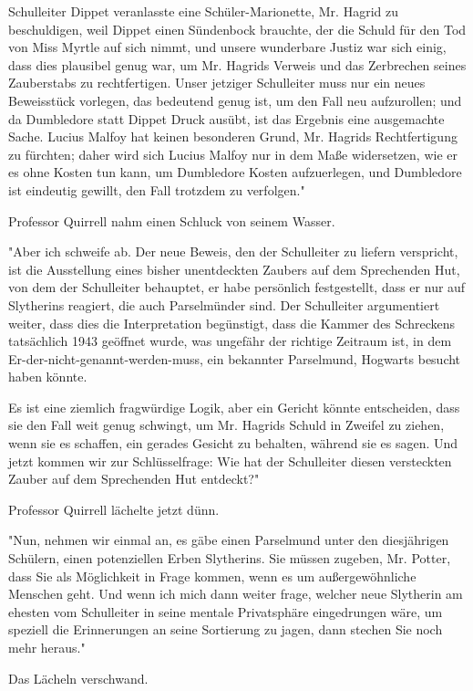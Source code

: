 {Schulleiter Dippet veranlasste eine Schüler-Marionette, Mr. Hagrid zu beschuldigen, weil Dippet einen Sündenbock brauchte, der die Schuld für den Tod von Miss Myrtle auf sich nimmt, und unsere wunderbare Justiz war sich einig, dass dies plausibel genug war, um Mr. Hagrids Verweis und das Zerbrechen seines Zauberstabs zu rechtfertigen. Unser jetziger Schulleiter muss nur ein neues Beweisstück vorlegen, das bedeutend genug ist, um den Fall neu aufzurollen; und da Dumbledore statt Dippet Druck ausübt, ist das Ergebnis eine ausgemachte Sache. Lucius Malfoy hat keinen besonderen Grund, Mr. Hagrids Rechtfertigung zu fürchten; daher wird sich Lucius Malfoy nur in dem Maße widersetzen, wie er es ohne Kosten tun kann, um Dumbledore Kosten aufzuerlegen, und Dumbledore ist eindeutig gewillt, den Fall trotzdem zu verfolgen."

Professor Quirrell nahm einen Schluck von seinem Wasser.

"Aber ich schweife ab. Der neue Beweis, den der Schulleiter zu liefern verspricht, ist die Ausstellung eines bisher unentdeckten Zaubers auf dem Sprechenden Hut, von dem der Schulleiter behauptet, er habe persönlich festgestellt, dass er nur auf Slytherins reagiert, die auch Parselmünder sind. Der Schulleiter argumentiert weiter, dass dies die Interpretation begünstigt, dass die Kammer des Schreckens tatsächlich 1943 geöffnet wurde, was ungefähr der richtige Zeitraum ist, in dem Er-der-nicht-genannt-werden-muss, ein bekannter Parselmund, Hogwarts besucht haben könnte.

Es ist eine ziemlich fragwürdige Logik, aber ein Gericht könnte entscheiden, dass sie den Fall weit genug schwingt, um Mr. Hagrids Schuld in Zweifel zu ziehen, wenn sie es schaffen, ein gerades Gesicht zu behalten, während sie es sagen. Und jetzt kommen wir zur Schlüsselfrage: Wie hat der Schulleiter diesen versteckten Zauber auf dem Sprechenden Hut entdeckt?"

Professor Quirrell lächelte jetzt dünn.

"Nun, nehmen wir einmal an, es gäbe einen Parselmund unter den diesjährigen Schülern, einen potenziellen Erben Slytherins. Sie müssen zugeben, Mr. Potter, dass Sie als Möglichkeit in Frage kommen, wenn es um außergewöhnliche Menschen geht. Und wenn ich mich dann weiter frage, welcher neue Slytherin am ehesten vom Schulleiter in seine mentale Privatsphäre eingedrungen wäre, um speziell die Erinnerungen an seine Sortierung zu jagen, dann stechen Sie noch mehr heraus."

Das Lächeln verschwand.

}
